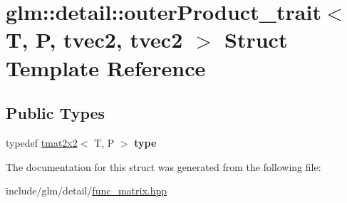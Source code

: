 \hypertarget{structglm_1_1detail_1_1outerProduct__trait_3_01T_00_01P_00_01tvec2_00_01tvec2_01_4}{}\section{glm\+:\+:detail\+:\+:outer\+Product\+\_\+trait$<$ T, P, tvec2, tvec2 $>$ Struct Template Reference}
\label{structglm_1_1detail_1_1outerProduct__trait_3_01T_00_01P_00_01tvec2_00_01tvec2_01_4}
\subsection*{Public Types}
\begin{DoxyCompactItemize}
\item 
\mbox{\label{structglm_1_1detail_1_1outerProduct__trait_3_01T_00_01P_00_01tvec2_00_01tvec2_01_4_a390fb582fa7caa73e53f69181b3b334e}} 
typedef \hyperlink{structglm_1_1tmat2x2}{tmat2x2}$<$ T, P $>$ {\bfseries type}
\end{DoxyCompactItemize}


The documentation for this struct was generated from the following file\+:\begin{DoxyCompactItemize}
\item 
include/glm/detail/\hyperlink{func__matrix_8hpp}{func\+\_\+matrix.\+hpp}\end{DoxyCompactItemize}
